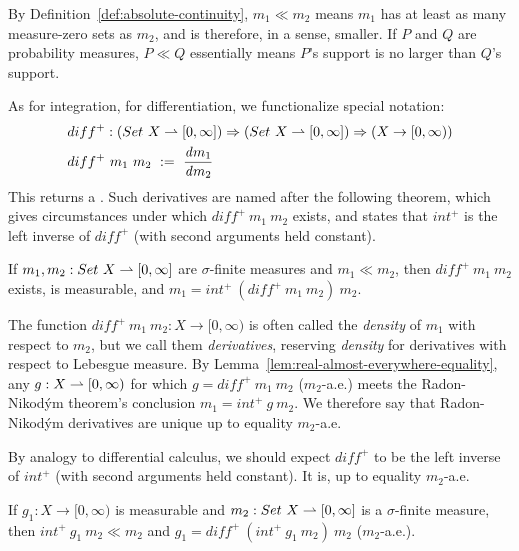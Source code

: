By Definition~\ref{def:absolute-continuity}, $m_1 \ll m_2$ means $m_1$ has at least as many measure-zero sets as $m_2$, and is therefore, in a sense, smaller.
If $P$ and $Q$ are probability measures, $P \ll Q$ essentially means $P$'s support is no larger than $Q$'s support.

As for integration, for differentiation, we functionalize special notation:
\begin{equation}
\begin{aligned}
	&diff^+ : (Set~X \rightharpoonup [0,\infty]) \Rightarrow (Set~X \rightharpoonup [0,\infty]) \Rightarrow (X \to [0,\infty)) \\
	&diff^+~m_1~m_2\ :=\ \frac{\mathit{d}m_1}{\mathit{d}m_2}
\end{aligned}
\label{eqn:int-diff-types}
\end{equation}
This returns a .
Such derivatives are named after the following theorem, which gives circumstances under which $diff^+~m_1~m_2$ exists, and states that $int^+$ is the left inverse of $diff^+$ (with second arguments held constant).

\begin{lemma}
\label{lem:radon-nikodym}
If $m_1,m_2 : Set~X \rightharpoonup [0,\infty]$ are $\sigma$-finite measures and $m_1 \ll m_2$, then $diff^+~m_1~m_2$ exists, is measurable, and $m_1 = int^+~(diff^+~m_1~m_2)~m_2$.
\end{lemma}

The function $diff^+~m_1~m_2 : X \to [0,\infty)$ is often called the \emph{density} of $m_1$ with respect to $m_2$, but we call them \emph{derivatives}, reserving \emph{density} for derivatives with respect to Lebesgue measure.
By Lemma~\ref{lem:real-almost-everywhere-equality}, any $g : X \rightharpoonup [0,\infty)$ for which $g = diff^+~m_1~m_2$ ($m_2$-a.e.) meets the Radon-Nikod\'ym theorem's conclusion $m_1 = int^+~g~m_2$.
We therefore say that Radon-Nikod\'ym derivatives are unique up to equality $m_2$-a.e.

By analogy to differential calculus, we should expect $diff^+$ to be the left inverse of $int^+$ (with second arguments held constant).
It is, up to equality $m_2$-a.e.
\begin{lemma}
\label{lem:diff-left-inverse-int}
If $g_1 : X \to [0,\infty)$ is measurable and $m_2 : Set~X \rightharpoonup [0,\infty]$ is a $\sigma$-finite measure, then $int^+~g_1~m_2 \ll m_2$ and $g_1 = diff^+~(int^+~g_1~m_2)~m_2$ ($m_2$-a.e.).
\end{lemma}
\begin{comment}
\begin{proof}
\begin{align*}
	&int~(f_1 - diff^+~(int^+~f_1~m_2)~m_2)~m_2
\\
	&\tab=\ int~f_1~m_2 - int~(diff^+~(int^+~f_1~m_2)~m_2)~m_2
\\
	&\tab=\ int^+~f_1~m_2 - int^+~(diff^+~(int^+~f_1~m_2)~m_2)~m_2
\\
	&\tab=\ int^+~f_1~m_2 - int^+~f_1~m_2
\end{align*}
\end{proof}
\end{comment}

